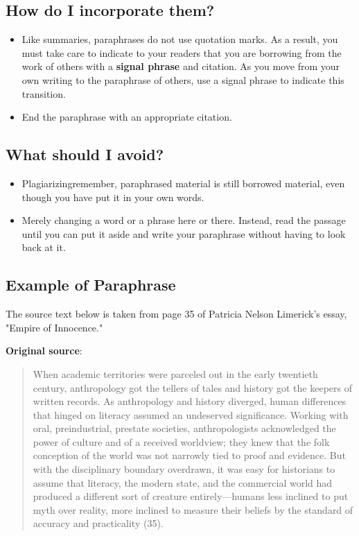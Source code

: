 \subsection{How do I incorporate them?}

\begin{itemize}
\item Like summaries, paraphrases do not use quotation marks. As a result, you must take care to indicate to your readers that you are borrowing from the work of others with a \textbf{signal phrase} and citation. As you move from your own writing to the paraphrase of others, use a signal phrase to indicate this transition.

\item End the paraphrase with an appropriate citation.

\end{itemize}

\subsection {What should I avoid?}

\begin{itemize}

\item Plagiarizing\textemdash remember, paraphrased material is still borrowed material, even 
though you have put it in your own words.

\item Merely changing a word or a phrase here or there. Instead, read the passage until 
you can put it aside and write your paraphrase without having to look back at it.
\end{itemize}

\subsection{Example of Paraphrase}
The source text below is taken from page 35 of Patricia Nelson Limerick's essay, "Empire of Innocence."

\textbf{Original source}:
\begin{quote}
When academic territories were parceled out in the early twentieth century, anthropology got the tellers of tales and history got the keepers of written records.  As anthropology and history diverged, human differences that hinged on literacy assumed an undeserved significance.  Working with oral, preindustrial, prestate societies, anthropologists acknowledged the power of culture and of a received worldview; they knew that the folk conception of the world was not narrowly tied to proof and evidence.  But with the disciplinary boundary overdrawn, it was easy for historians to assume that literacy, the modern state, and the commercial world had produced a different sort of creature entirely—humans less inclined to put myth over reality, more inclined to measure their beliefs by the standard of accuracy and practicality (35).
\end{quote}

